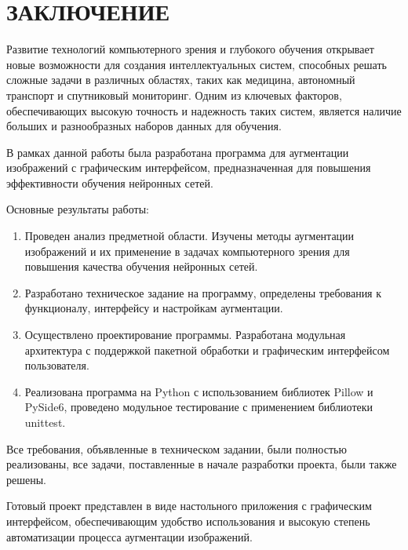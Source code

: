 \section*{ЗАКЛЮЧЕНИЕ}

Развитие технологий компьютерного зрения и глубокого обучения открывает новые возможности для создания интеллектуальных систем, способных решать сложные задачи в различных областях, таких как медицина, автономный транспорт и спутниковый мониторинг. Одним из ключевых факторов, обеспечивающих высокую точность и надежность таких систем, является наличие больших и разнообразных наборов данных для обучения.

В рамках данной работы была разработана программа для аугментации изображений с графическим интерфейсом, предназначенная для повышения эффективности обучения нейронных сетей.

Основные результаты работы:

\begin{enumerate}
	\item Проведен анализ предметной области. Изучены методы аугментации изображений и их применение в задачах компьютерного зрения для повышения качества обучения нейронных сетей.
	\item Разработано техническое задание на программу, определены требования к функционалу, интерфейсу и настройкам аугментации.
	\item Осуществлено проектирование программы. Разработана модульная архитектура с поддержкой пакетной обработки и графическим интерфейсом пользователя.
	\item Реализована программа на Python с использованием библиотек Pillow и PySide6, проведено модульное тестирование с применением библиотеки unittest.
\end{enumerate}

Все требования, объявленные в техническом задании, были полностью реализованы, все задачи, поставленные в начале разработки проекта, были также решены.

Готовый проект представлен в виде настольного приложения с графическим интерфейсом, обеспечивающим удобство использования и высокую степень автоматизации процесса аугментации изображений.
